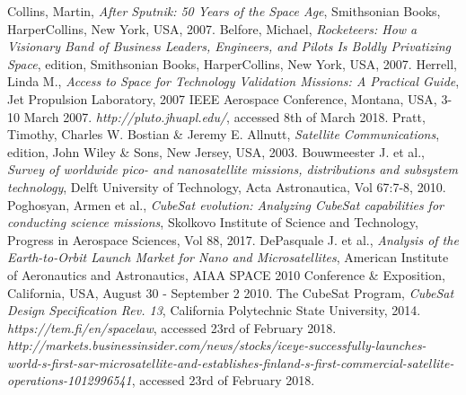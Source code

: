 \documentclass[english,12pt,a4paper,pdftex,elec,utf8]{aaltothesis}
\begin{document}
\clearpage

{}
\begin{thebibliography}{99}

 Collins, Martin,
  \textit{After Sputnik: 50 Years of the Space Age}, Smithsonian Books, HarperCollins, New York, USA, 2007.
 Belfore, Michael,
  \textit{Rocketeers: How a Visionary Band of Business Leaders, Engineers, and Pilots Is Boldly Privatizing Space},  edition, Smithsonian Books, HarperCollins, New York, USA, 2007.
 Herrell, Linda M.,
  \textit{Access to Space for Technology Validation Missions: A Practical Guide}, Jet Propulsion Laboratory, 2007 IEEE Aerospace Conference, Montana, USA, 3-10 March 2007. 
  \textit{http://pluto.jhuapl.edu/}, accessed 8th of March 2018. 
 Pratt, Timothy, Charles W. Bostian \& Jeremy E. Allnutt,
  \textit{Satellite Communications},  edition, John Wiley \& Sons, New Jersey, USA, 2003.
 Bouwmeester J. et al.,
  \textit{Survey of worldwide pico- and nanosatellite missions, distributions
and subsystem technology}, Delft University of Technology, Acta Astronautica, Vol 67:7-8, 2010.
 Poghosyan, Armen et al.,
  \textit{CubeSat evolution: Analyzing CubeSat capabilities for conducting science missions}, Skolkovo Institute of Science and Technology, Progress in Aerospace Sciences, Vol 88, 2017.
 DePasquale J. et al.,
  \textit{Analysis of the Earth-to-Orbit Launch Market for Nano and Microsatellites}, American Institute of Aeronautics and Astronautics, AIAA SPACE 2010 Conference \& Exposition, California, USA, August 30 - September 2 2010.
 The CubeSat Program,
  \textit{CubeSat Design Specification Rev. 13}, California Polytechnic State University, 2014.
  \textit{https://tem.fi/en/spacelaw}, accessed 23rd of February 2018.
  \textit{http://markets.businessinsider.com/news/stocks/iceye-successfully-launches-world-s-first-sar-microsatellite-and-establishes-finland-s-first-commercial-satellite-operations-1012996541}, accessed 23rd of February 2018.

\end{thebibliography}
\end{document}
